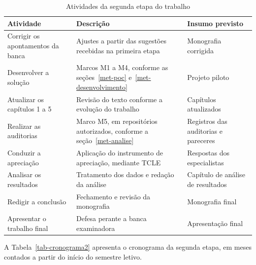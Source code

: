 \begin{table}[htbp]
\centering
\caption{Atividades da segunda etapa do trabalho}
\label{tab-atividades2}
\begingroup
\footnotesize
\SingleSpacing
\setlength{\tabcolsep}{4pt}
\renewcommand{\arraystretch}{1.15}
\begin{tabularx}{\textwidth}{>{\raggedright\arraybackslash}p{4.0cm}>{\raggedright\arraybackslash}X>{\raggedright\arraybackslash}p{3.4cm}}
\hline
\textbf{Atividade} & \textbf{Descrição} & \textbf{Insumo previsto} \\ \hline
Corrigir os apontamentos da banca & Ajustes a partir das sugestões recebidas na primeira etapa & Monografia corrigida \\ \hline
Desenvolver a solução & Marcos M1 a M4, conforme as seções~\ref{met-poc} e~\ref{met-desenvolvimento} & Projeto piloto \\ \hline
Atualizar os capítulos 1 a 5 & Revisão do texto conforme a evolução do trabalho & Capítulos atualizados \\ \hline
Realizar as auditorias & Marco M5, em repositórios autorizados, conforme a seção~\ref{met-analise} & Registros das auditorias e pareceres \\ \hline
Conduzir a apreciação & Aplicação do instrumento de apreciação, mediante TCLE & Respostas dos especialistas \\ \hline
Analisar os resultados & Tratamento dos dados e redação da análise & Capítulo de análise de resultados \\ \hline
Redigir a conclusão & Fechamento e revisão da monografia & Monografia final \\ \hline
Apresentar o trabalho final & Defesa perante a banca examinadora & Apresentação final \\ \hline
\end{tabularx}
\endgroup
{}
\end{table}

A Tabela~\ref{tab-cronograma2} apresenta o cronograma da segunda etapa, em meses contados a partir do início do semestre letivo.

